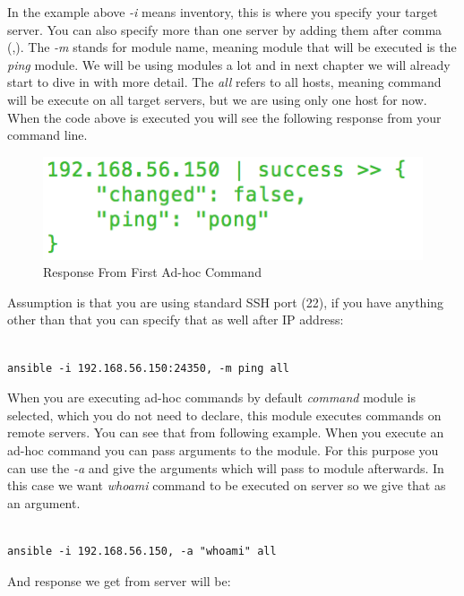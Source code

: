 \documentclass[10pt]{book}
\begin{document}
In the example above \emph{-i} means inventory, this is where you specify your target server. 
You can also specify more than one server by adding them after comma (,). The \emph{-m} stands for module name, 
meaning module that will be executed is the \emph{ping} module. We will be using modules a lot and in
next chapter we will already start to dive in with more detail. The \emph{all} 
refers to all hosts, meaning command will be execute on all target servers, 
but we are using only one host for now. When the code above is executed you will see the following response from your 
command line.


\begin{figure}[ht]
	\centering
  \includegraphics{figures/first-ad-hoc-command.png}
	\caption{Response From First Ad-hoc Command}
\end{figure}


Assumption is that you are using standard SSH port (22), if you have anything 
other than that you can specify that as well after IP address:

\begin{Verbatim}

ansible -i 192.168.56.150:24350, -m ping all

\end{Verbatim}



When you are executing ad-hoc commands by default \emph{command} module is selected, 
which you do not need to declare, this module executes commands on remote servers. You can see that from 
following example. When you execute an ad-hoc command you can pass arguments to the module. For this 
purpose you can use the \emph{-a}  and give the arguments which will pass to 
module afterwards. In this case we want \emph{whoami} command to be executed on server so 
we give that as an argument.

\begin{Verbatim}

ansible -i 192.168.56.150, -a "whoami" all

\end{Verbatim}

And response we get from server will be:
\end{document}
